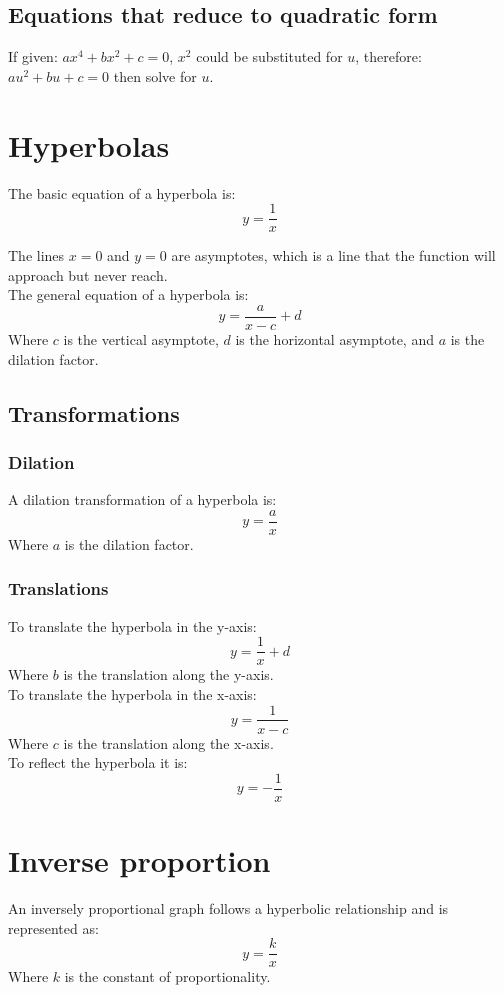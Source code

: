 \documentclass{book}
\begin{document}
\section{Equations that reduce to quadratic form}
If given: $ax^4 + bx^2 + c = 0$, $x^2$ could be substituted for $u$, therefore: $au^2 + bu + c = 0$ then solve for $u$.

\chapter{Hyperbolas}
The basic equation of a hyperbola is:
\[
	y = \frac{1}{x}
\]

The lines $x = 0$ and $y = 0$ are asymptotes, which is a line that the function will approach but never reach.\\

The general equation of a hyperbola is:
\[
	y = \frac{a}{x - c} + d
\]
Where $c$ is the vertical asymptote, $d$ is the horizontal asymptote, and $a$ is the dilation factor.

\section{Transformations}
\subsection{Dilation}
A dilation transformation of a hyperbola is:
\[
	y = \frac{a}{x}
\]
Where $a$ is the dilation factor.

\subsection{Translations}
To translate the hyperbola in the y-axis:
\[
	y = \frac{1}{x} + d
\]
Where $b$ is the translation along the y-axis.\\

To translate the hyperbola in the x-axis:
\[
	y = \frac{1}{x - c}
\]
Where $c$ is the translation along the x-axis.\\

To reflect the hyperbola it is:
\[
	y = -\frac{1}{x}
\]

\chapter{Inverse proportion}
An inversely proportional graph follows a hyperbolic relationship and is represented as:
\[
	y = \frac{k}{x}
\]
Where $k$ is the constant of proportionality.
\end{document}
